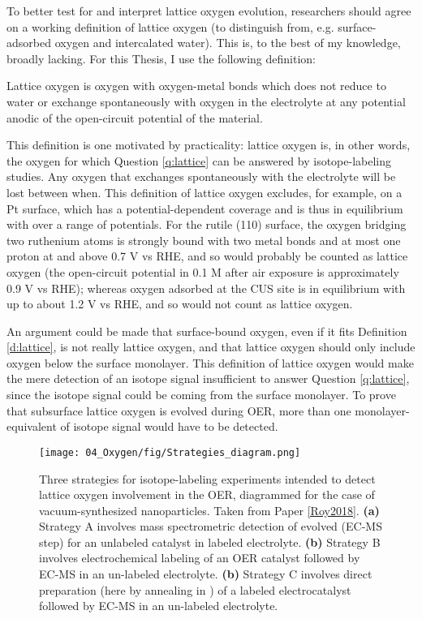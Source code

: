 To better test for and interpret lattice oxygen evolution, researchers should agree on a working definition of lattice oxygen (to distinguish from, e.g. surface-adsorbed oxygen and intercalated water). This is, to the best of my knowledge, broadly lacking. For this Thesis, I use the following definition:

\begin{definition}
	Lattice oxygen is oxygen with oxygen-metal bonds which does not reduce to water or exchange spontaneously with oxygen in the electrolyte at any potential anodic of the open-circuit potential of the material. 
	 \label{d:lattice}
\end{definition}

This definition is one motivated by practicality: lattice oxygen is, in other words, the oxygen for which Question \ref{q:lattice} can be answered by isotope-labeling studies. Any oxygen that exchanges spontaneously with the electrolyte will be lost between when. This definition of lattice oxygen excludes, for example,  on a Pt surface, which has a potential-dependent coverage and is thus in equilibrium with  over a range of potentials. For the rutile  (110) surface, the oxygen bridging two ruthenium atoms is strongly bound with two metal bonds and at most one proton at and above 0.7 V vs RHE\cite{Rao2017a}, and so would probably be counted as lattice oxygen (the open-circuit potential in 0.1 M  after air exposure is approximately 0.9 V vs RHE); whereas oxygen adsorbed at the CUS site is in equilibrium with  up to about 1.2 V vs RHE\cite{Rao2017a}, and so would not count as lattice oxygen.

An argument could be made that surface-bound oxygen, even if it fits Definition \ref{d:lattice}, is not really lattice oxygen, and that lattice oxygen should only include oxygen below the surface monolayer. This definition of lattice oxygen would make the mere detection of an isotope signal insufficient to answer Question \ref{q:lattice}, since the isotope signal could be coming from the surface monolayer. To prove that subsurface lattice oxygen is evolved during OER, more than one monolayer-equivalent of isotope signal would have to be detected.


\begin{figure}[h!]
	\centering
	\texttt{[image: 04\_Oxygen/fig/Strategies\_diagram.png]}
	\caption{Three strategies for isotope-labeling experiments intended to detect lattice oxygen involvement in the OER, diagrammed for the case of vacuum-synthesized  nanoparticles. Taken from Paper \ref{Roy2018}. \textbf{(a)} Strategy A involves mass spectrometric detection of evolved  (EC-MS step) for an unlabeled catalyst in labeled electrolyte. \textbf{(b)} Strategy B involves electrochemical labeling of an OER catalyst followed by EC-MS in an un-labeled electrolyte. \textbf{(b)} Strategy C involves direct preparation (here by annealing in ) of a labeled electrocatalyst followed by EC-MS in an un-labeled electrolyte.}
	\label{fig:strategies}
\end{figure}

